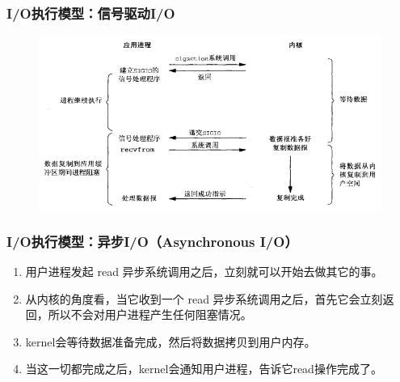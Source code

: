 \begin{frame}[fragile]
    \frametitle{I/O执行模型：信号驱动I/O}
    \begin{figure}
        \includegraphics[width=0.8\linewidth]{figs/signal-io.png}
    \end{figure}
\end{frame}
\begin{frame}[fragile]
    \frametitle{I/O执行模型：异步I/O（Asynchronous I/O）}
    \begin{enumerate}
    \item 用户进程发起 read 异步系统调用之后，立刻就可以开始去做其它的事。
    \item 从内核的角度看，当它收到一个 read 异步系统调用之后，首先它会立刻返回，所以不会对用户进程产生任何阻塞情况。
    \item kernel会等待数据准备完成，然后将数据拷贝到用户内存。
    \item 当这一切都完成之后，kernel会通知用户进程，告诉它read操作完成了。
    \end{enumerate}    
    
    
\end{frame}

